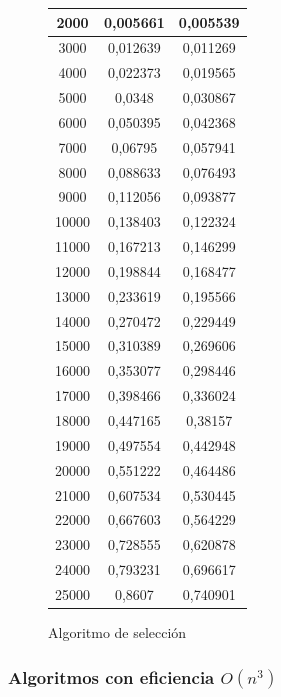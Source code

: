 \documentclass[12pt,spanish]{article}
\begin{document}
\begin{figure}[H]
\begin{tabular}{|c|c|c|}
\hline
2000 & 0,005661 & 0,005539\\
\hline
3000 & 0,012639 & 0,011269\\
\hline
4000 & 0,022373 & 0,019565\\
\hline
5000 & 0,0348 & 0,030867\\
\hline
6000 & 0,050395 & 0,042368\\
\hline
7000 & 0,06795 & 0,057941\\
\hline
8000 & 0,088633 & 0,076493\\
\hline
9000 & 0,112056 & 0,093877\\
\hline
10000 & 0,138403 & 0,122324\\
\hline
11000 & 0,167213 & 0,146299\\
\hline
12000 & 0,198844 & 0,168477\\
\hline
13000 & 0,233619 & 0,195566\\
\hline
14000 & 0,270472 & 0,229449\\
\hline
15000 & 0,310389 & 0,269606\\
\hline
16000 & 0,353077 & 0,298446\\
\hline
17000 & 0,398466 & 0,336024\\
\hline
18000 & 0,447165 & 0,38157\\
\hline
19000 & 0,497554 & 0,442948\\
\hline
20000 & 0,551222 & 0,464486\\
\hline
21000 & 0,607534 & 0,530445\\
\hline
22000 & 0,667603 & 0,564229\\
\hline
23000 & 0,728555 & 0,620878\\
\hline
24000 & 0,793231 & 0,696617\\
\hline
25000 & 0,8607 & 0,740901\\
\hline
\end{tabular}
\caption{Algoritmo de selección}
\end{figure}
\subsubsection{Algoritmos con eficiencia $O(n^3)$}
\end{document}
